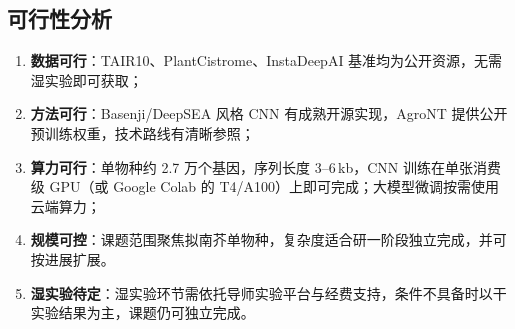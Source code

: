 \documentclass[UTF8,11pt,a4paper]{ctexart}
\begin{document}
\subsection{可行性分析}
\label{sec:plan-feasibility}

\begin{enumerate}
\item \textbf{数据可行}：TAIR10、PlantCistrome、InstaDeepAI 基准均为公开资源，无需湿实验即可获取；
\item \textbf{方法可行}：Basenji/DeepSEA 风格 CNN 有成熟开源实现，AgroNT 提供公开预训练权重，技术路线有清晰参照；
\item \textbf{算力可行}：单物种约 2.7 万个基因，序列长度 3--6\,kb，CNN 训练在单张消费级 GPU（或 Google Colab 的 T4/A100）上即可完成；大模型微调按需使用云端算力；
\item \textbf{规模可控}：课题范围聚焦拟南芥单物种，复杂度适合研一阶段独立完成，并可按进展扩展。
\item \textbf{湿实验待定}：湿实验环节需依托导师实验平台与经费支持，条件不具备时以干实验结果为主，课题仍可独立完成。
\end{enumerate}
\end{document}
